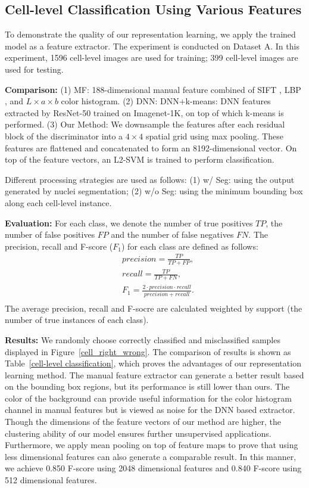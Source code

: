\documentclass[journal]{IEEEtran}
\begin{document}
\subsection{Cell-level Classification Using Various Features}

To demonstrate the quality of our representation learning, we apply the trained model as a feature extractor. The experiment is conducted on Dataset A. In this experiment, 1596 cell-level images are used for training; 399 cell-level images are used for testing.

\textbf{Comparison:} (1) MF: 188-dimensional manual feature combined of SIFT \cite{lowe2004distinctive}, LBP \cite{ojala2002multiresolution}, and $L \times a \times b$ color histogram. (2) DNN: DNN+k-means: DNN features extracted by ResNet-50 trained on Imagenet-1K, on top of which k-means is performed. (3) Our Method: We downsample the features after each residual block of the discriminator into a $4 \times 4$ spatial grid using max pooling. These features are flattened and concatenated to form an 8192-dimensional vector. On top of the feature vectors, an L2-SVM is trained to perform classification.

Different processing strategies are used as follows: (1) w/ Seg: using the output generated by nuclei segmentation; (2) w/o Seg: using the minimum bounding box along each cell-level instance.

\textbf{Evaluation:} For each class, we denote the number of true positives $TP$, the number of false positives $FP$ and the number of false negatives $FN$. The precision, recall and F-score ($F_1$) for each class are defined as follows: \begin{equation}
\begin{aligned}
& precision=\frac{TP}{TP+FP}, \\
& recall=\frac{TP}{TP+FN}, \\
& F_1 = \frac{2 \cdot precision \cdot recall}{precision + recall}. \\
\end{aligned}
\label{eq:fscore}
\end{equation}The average precision, recall and F-socre are calculated weighted by support (the number of true instances of each class).

\textbf{Results:} We randomly choose correctly classified and misclassified samples displayed in Figure~\ref{cell_right_wrong}. The comparison of results is shown as Table~\ref{cell-level classification}, which proves the advantages of our representation learning method. The manual feature extractor can generate a better result based on the bounding box regions, but its performance is still lower than ours. The color of the background can provide useful information for the color histogram channel in manual features but is viewed as noise for the DNN based extractor. Though the dimensions of the feature vectors of our method are higher, the clustering ability of our model ensures further unsupervised applications. Furthermore, we apply mean pooling on top of feature maps to prove that using less dimensional features can also generate a comparable result. In this manner, we achieve 0.850 F-score using 2048 dimensional features and 0.840 F-score using 512 dimensional features.
\end{document}
